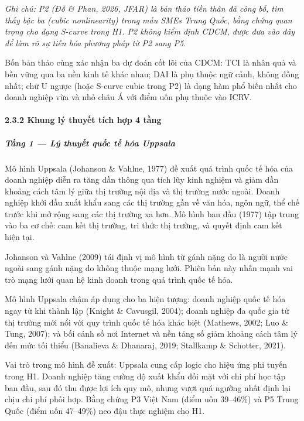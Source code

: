 \documentclass[12pt,a4paper]{article}
\begin{document}
\emph{Ghi chú: P2 (Đỗ \& Phan, 2026, JFAR) là bản thảo tiền thân đã công
bố, tìm thấy bậc ba (cubic nonlinearity) trong mẫu SMEs Trung Quốc, bằng
chứng quan trọng cho dạng S-curve trong H1. P2 không kiểm định CDCM,
được đưa vào đây để làm rõ sự tiến hóa phương pháp từ P2 sang P5.}

Bốn bản thảo cùng xác nhận ba dự đoán cốt lõi của CDCM: TCI là nhân quả
và bền vững qua ba nền kinh tế khác nhau; DAI là phụ thuộc ngữ cảnh,
không đồng nhất; chữ U ngược (hoặc S-curve cubic trong P2) là dạng hàm
phổ biến nhất cho doanh nghiệp vừa và nhỏ châu Á với điểm uốn phụ thuộc
vào ICRV.

\hypertarget{232-khung-luxfd-thuyux1ebft-tuxedch-hux1ee3p-4-tux1ea7ng}{%
\paragraph{2.3.2 Khung lý thuyết tích hợp 4
tầng}\label{232-khung-luxfd-thuyux1ebft-tuxedch-hux1ee3p-4-tux1ea7ng}}

\hypertarget{tux1ea7ng-1--luxfd-thuyux1ebft-quux1ed1c-tux1ebf-huxf3a-uppsala}{%
\subparagraph{Tầng 1 --- Lý thuyết quốc tế hóa
Uppsala}\label{tux1ea7ng-1--luxfd-thuyux1ebft-quux1ed1c-tux1ebf-huxf3a-uppsala}}

Mô hình Uppsala (Johanson \& Vahlne, 1977) đề xuất quá trình quốc tế hóa
của doanh nghiệp diễn ra tăng dần thông qua tích lũy kinh nghiệm và giảm
dần khoảng cách tâm lý giữa thị trường nội địa và thị trường nước ngoài.
Doanh nghiệp khởi đầu xuất khẩu sang các thị trường gần về văn hóa, ngôn
ngữ, thể chế trước khi mở rộng sang các thị trường xa hơn. Mô hình ban
đầu (1977) tập trung vào ba cơ chế: cam kết thị trường, tri thức thị
trường, và quyết định cam kết hiện tại.

Johanson và Vahlne (2009) tái định vị mô hình từ gánh nặng do là người
nước ngoài sang gánh nặng do không thuộc mạng lưới. Phiên bản này nhấn
mạnh vai trò mạng lưới quan hệ kinh doanh trong quá trình quốc tế hóa.

Mô hình Uppsala chậm áp dụng cho ba hiện tượng: doanh nghiệp quốc tế hóa
ngay từ khi thành lập (Knight \& Cavusgil, 2004); doanh nghiệp đa quốc
gia từ thị trường mới nổi với quy trình quốc tế hóa khác biệt (Mathews,
2002; Luo \& Tung, 2007); và bối cảnh số nơi Internet và nền tảng số
giảm khoảng cách tâm lý đến mức tối thiểu (Banalieva \& Dhanaraj, 2019;
Stallkamp \& Schotter, 2021).

Vai trò trong mô hình đề xuất: Uppsala cung cấp logic cho hiệu ứng phi
tuyến trong H1. Doanh nghiệp tăng cường độ xuất khẩu đối mặt với chi phí
học tập ban đầu, sau đó thu được lợi ích quy mô, nhưng vượt quá ngưỡng
nhất định lại chịu chi phí phối hợp. Bằng chứng P3 Việt Nam (điểm uốn
39--46\%) và P5 Trung Quốc (điểm uốn 47--49\%) neo đậu thực nghiệm cho
H1.
\end{document}
